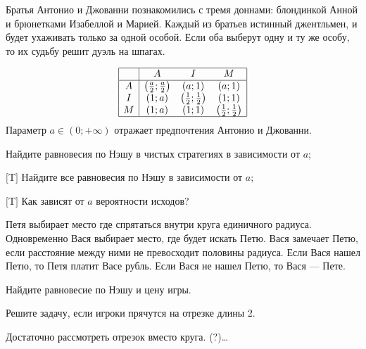 \begin{problem}
Братья Антонио и Джованни познакомились с тремя доннами: блондинкой Анной и брюнетками Изабеллой и Марией. Каждый из братьев истинный джентльмен, и будет ухаживать только за одной особой. Если оба выберут одну и ту же особу, то их судьбу решит дуэль на шпагах.

\[\begin{array}{|c|ccc|}  \hline {} & {A} & {I} & {M} \\  \hline {A} & {\left(\frac{a}{2} ;\frac{a}{2} \right)} & {\left(a;1\right)} & {\left(a;1\right)} \\ {I} & {\left(1;a\right)} & {\left(\frac{1}{2} ;\frac{1}{2} \right)} & {\left(1;1\right)} \\ {M} & {\left(1;a\right)} & {\left(1;1\right)} & {\left(\frac{1}{2} ;\frac{1}{2} \right)} \\  \hline  \end{array}\]
Параметр  $a\in \left(0;+\infty \right)$  отражает предпочтения Антонио и Джованни.\par
\item 	Найдите равновесия по Нэшу в чистых стратегиях в зависимости от  $a$;\par
\item 	$[$T$]$ Найдите все равновесия по Нэшу в зависимости от  $a$; \par
\item 	$[$T$]$ Как зависят от  $a$  вероятности исходов?



\begin{sol}

\end{sol}
\end{problem}



\begin{problem}
\begin{source}
 \cite{lones:dtc}
\end{source}
Петя выбирает место где спрятаться внутри круга единичного радиуса. Одновременно Вася выбирает место, где будет искать Петю. Вася замечает Петю, если расстояние между ними не превосходит половины радиуса. Если Вася нашел Петю, то Петя платит Васе рубль. Если Вася не нашел Петю, то Вася --- Пете. \par
\item  Найдите равновесие по Нэшу и цену игры. \par
\item Решите задачу, если игроки прячутся на отрезке длины 2.



\begin{sol}

Достаточно рассмотреть отрезок вместо круга. (?)\ldots
\end{sol}
\end{problem}




